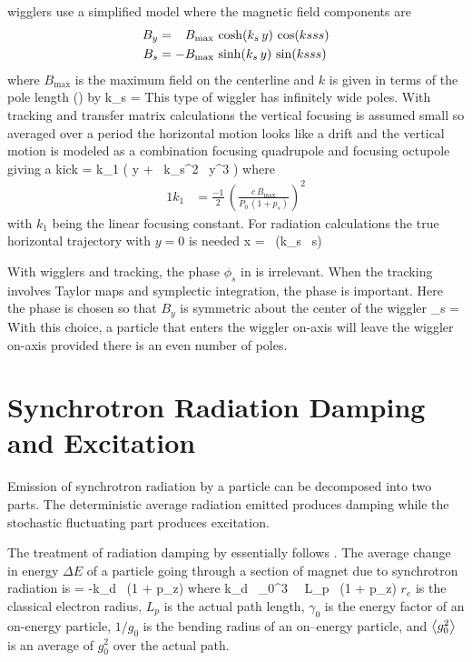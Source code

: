  wigglers use a simplified model where the magnetic
field components are
\begin{alignat}{1}
  B_y &= \hphantom{-} B_{\max} \, \cosh(k_s \, y) \, \cos(ksss) \nonumber \\
  B_s &= -B_{\max} \, \sinh(k_s \, y) \, \sin(ksss) 
  \label{bbkyks}
\end{alignat}
where $B_{\max}$ is the maximum field on the centerline and $k$ is
given in terms of the pole length () by
\Begineq
  k_s = 
\Endeq
This type of wiggler has infinitely wide poles. With
 tracking and transfer matrix calculations the
vertical focusing is assumed small so averaged over a period the
horizontal motion looks like a drift and the vertical motion is
modeled as a combination focusing quadrupole and focusing octupole
giving a kick\cite{b:corbett}
\Begineq
   = k_1 \left( y +  \, k_s^2 \, y^3 \right)
\Endeq
where
\begin{alignat}{1}
  k_1 &= \frac{-1}{2} \, \left( \frac{c \, B_{\max}}{P_0 \, (1 + p_s)} \right)^2 
\end{alignat}
with $k_1$ being the linear focusing constant. For radiation
calculations the true horizontal trajectory with $y = 0$ is needed
\Begineq
  x =  \, \cos (k_s \, s)
\Endeq

With  wigglers and  tracking, the
phase $\phi_s$ in  is irrelevant. When the tracking
involves Taylor maps and symplectic integration, the phase is
important. Here the phase is chosen so that $B_y$ is symmetric about
the center of the wiggler
\Begineq
  \phi_s = 
\Endeq
With this choice, a particle that enters the wiggler on-axis will
leave the wiggler on-axis provided there is an even number of poles.


\section{Synchrotron Radiation Damping and Excitation}
\label{s:radiation}

Emission of synchrotron radiation by a particle can be decomposed into
two parts. The deterministic average radiation emitted produces damping
while the stochastic fluctuating part produces excitation\cite{b:jowett}.

The treatment of radiation damping by \bmad essentially follows \mad.
The average change in energy $\Delta E$ of a particle going through a
section of magnet due to synchrotron radiation is
\Begineq
   = -k_d \, (1 + p_z)
\Endeq
where
\Begineq
  k_d \equiv {} \, \gamma_0^3 \,  \, L_p \,  
  (1 + p_z)
  \label{k2r3g}
\Endeq
$r_e$ is the classical electron radius, $L_p$ is the actual path
length, $\gamma_0$ is the energy factor of an on-energy particle, $1/g_0$
is the bending radius of an on--energy particle, and $\left\langle g_0^2 \right\rangle$ is an
average of $g_0^2$ over the actual path.

